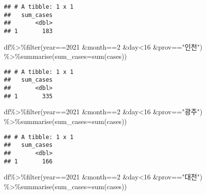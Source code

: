\documentclass[
]{article}
\newenvironment{Shaded}{\begin{snugshade}}{\end{snugshade}}
\newcommand{\AttributeTok}[1]{\textcolor[rgb]{0.77,0.63,0.00}{#1}}
\newcommand{\DecValTok}[1]{\textcolor[rgb]{0.00,0.00,0.81}{#1}}
\newcommand{\FunctionTok}[1]{\textcolor[rgb]{0.00,0.00,0.00}{#1}}
\newcommand{\NormalTok}[1]{#1}
\newcommand{\SpecialCharTok}[1]{\textcolor[rgb]{0.00,0.00,0.00}{#1}}
\newcommand{\StringTok}[1]{\textcolor[rgb]{0.31,0.60,0.02}{#1}}
\begin{document}
\begin{verbatim}
## # A tibble: 1 x 1
##   sum_cases
##       <dbl>
## 1       183
\end{verbatim}

\begin{Shaded}
\begin{Highlighting}[]
\NormalTok{df}\SpecialCharTok{\%\textgreater{}\%}\FunctionTok{filter}\NormalTok{(year}\SpecialCharTok{==}\DecValTok{2021} \SpecialCharTok{\&}\NormalTok{month}\SpecialCharTok{==}\DecValTok{2} \SpecialCharTok{\&}\NormalTok{day}\SpecialCharTok{\textless{}}\DecValTok{16} \SpecialCharTok{\&}\NormalTok{prov}\SpecialCharTok{==}\StringTok{"인천"}\NormalTok{) }\SpecialCharTok{\%\textgreater{}\%}\FunctionTok{summarise}\NormalTok{(}\AttributeTok{sum\_cases=}\FunctionTok{sum}\NormalTok{(cases))}
\end{Highlighting}
\end{Shaded}

\begin{verbatim}
## # A tibble: 1 x 1
##   sum_cases
##       <dbl>
## 1       335
\end{verbatim}

\begin{Shaded}
\begin{Highlighting}[]
\NormalTok{df}\SpecialCharTok{\%\textgreater{}\%}\FunctionTok{filter}\NormalTok{(year}\SpecialCharTok{==}\DecValTok{2021} \SpecialCharTok{\&}\NormalTok{month}\SpecialCharTok{==}\DecValTok{2} \SpecialCharTok{\&}\NormalTok{day}\SpecialCharTok{\textless{}}\DecValTok{16} \SpecialCharTok{\&}\NormalTok{prov}\SpecialCharTok{==}\StringTok{"광주"}\NormalTok{) }\SpecialCharTok{\%\textgreater{}\%}\FunctionTok{summarise}\NormalTok{(}\AttributeTok{sum\_cases=}\FunctionTok{sum}\NormalTok{(cases))}
\end{Highlighting}
\end{Shaded}

\begin{verbatim}
## # A tibble: 1 x 1
##   sum_cases
##       <dbl>
## 1       166
\end{verbatim}

\begin{Shaded}
\begin{Highlighting}[]
\NormalTok{df}\SpecialCharTok{\%\textgreater{}\%}\FunctionTok{filter}\NormalTok{(year}\SpecialCharTok{==}\DecValTok{2021} \SpecialCharTok{\&}\NormalTok{month}\SpecialCharTok{==}\DecValTok{2} \SpecialCharTok{\&}\NormalTok{day}\SpecialCharTok{\textless{}}\DecValTok{16} \SpecialCharTok{\&}\NormalTok{prov}\SpecialCharTok{==}\StringTok{"대전"}\NormalTok{) }\SpecialCharTok{\%\textgreater{}\%}\FunctionTok{summarise}\NormalTok{(}\AttributeTok{sum\_cases=}\FunctionTok{sum}\NormalTok{(cases))}
\end{Highlighting}
\end{Shaded}
\end{document}
